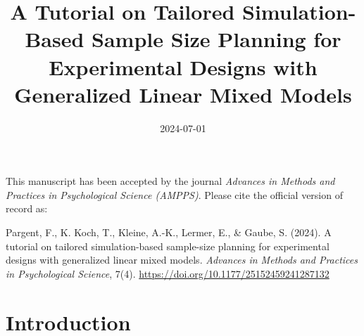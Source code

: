 \documentclass[
  man,
  floatsintext,
  longtable,
  a4paper,
  nolmodern,
  notxfonts,
  notimes,
  colorlinks=true,linkcolor=blue,citecolor=blue,urlcolor=blue]{apa7}
\title{A Tutorial on Tailored Simulation-Based Sample Size Planning for
Experimental Designs with Generalized Linear Mixed Models}
\date{2024-07-01}
\begin{document}
\maketitle


\setcounter{secnumdepth}{-\maxdimen} %

\setlength\LTleft{0pt}


\begin{tcolorbox}[enhanced jigsaw, leftrule=.75mm, left=2mm, title=\textcolor{quarto-callout-important-color}{\faExclamation}\hspace{0.5em}{Important}, colframe=quarto-callout-important-color-frame, breakable, rightrule=.15mm, coltitle=black, titlerule=0mm, arc=.35mm, toprule=.15mm, bottomtitle=1mm, colbacktitle=quarto-callout-important-color!10!white, opacitybacktitle=0.6, bottomrule=.15mm, toptitle=1mm, opacityback=0, colback=white]

This manuscript has been accepted by the journal \emph{Advances in
Methods and Practices in Psychological Science (AMPPS)}. Please cite the
official version of record as:

Pargent, F., K. Koch, T., Kleine, A.-K., Lermer, E., \& Gaube, S.
(2024). A tutorial on tailored simulation-based sample-size planning for
experimental designs with generalized linear mixed models.
\emph{Advances in Methods and Practices in Psychological Science}, 7(4).
\url{https://doi.org/10.1177/25152459241287132}

\end{tcolorbox}

\section{Introduction}\label{introduction}
\end{document}
